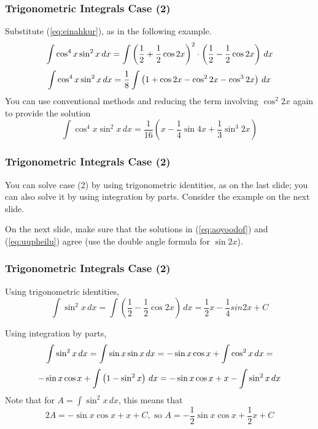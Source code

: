 \documentclass[xcolor=dvipsnames]{beamer}
\begin{document}
\begin{frame}
  \frametitle{Trigonometric Integrals Case (2)}
Substitute (\ref{eq:einahkur}), as in the following example.
\begin{equation}
  \label{eq:owamaela}
  \int\cos^{4}x\sin^{2}x\,dx=\int\left(\frac{1}{2}+\frac{1}{2}\cos{}2x\right)^{2}\cdot\left(\frac{1}{2}-\frac{1}{2}\cos{}2x\right)\,dx\notag
\end{equation}
\begin{equation}
  \label{eq:acahjahj}
  \int\cos^{4}x\sin^{2}x\,dx=\frac{1}{8}\int\left(1+\cos{}2x-\cos^{2}2x-\cos^{3}2x\right)\,dx\notag
\end{equation}
You can use conventional methods and reducing the term involving
$\cos^{2}2x$ again to provide the solution
\begin{equation}
  \label{eq:cohnalee}
  \int\cos^{4}x\sin^{2}x\,dx=\frac{1}{16}\left(x-\frac{1}{4}\sin{}4x+\frac{1}{3}\sin^{3}2x\right)
\end{equation}
\end{frame}

\begin{frame}
  \frametitle{Trigonometric Integrals Case (2)}
You can solve case (2) by using trigonometric identities, as on the
last slide; you can also solve it by using integration by parts. Consider
the example on the next slide.

\bigskip

On the next slide, make sure that the solutions in (\ref{eq:aoyoodof}) and
(\ref{eq:uupheilu}) agree (use the double angle formula for $\sin{}2x$).
\end{frame}

\begin{frame}
  \frametitle{Trigonometric Integrals Case (2)}
Using trigonometric identities,
\begin{equation}
  \label{eq:aoyoodof}
  \int\sin^{2}x\,dx=\int\left(\frac{1}{2}-\frac{1}{2}\cos{}2x\right)\,dx=\frac{1}{2}x-\frac{1}{4}sin{}2x+C
\end{equation}

Using integration by parts,
\begin{equation}
  \label{eq:hezaifoo}
  \int\sin^{2}x\,dx=\int\sin{}x\sin{}x\,dx=-\sin{}x\cos{}x+\int\cos^{2}x\,dx=\notag
\end{equation}
\begin{equation}
  \label{eq:uophaequ}
  -\sin{}x\cos{}x+\int\left(1-\sin^{2}x\right)\,dx=-\sin{}x\cos{}x+x-\int\sin^{2}x\,dx\notag
\end{equation}
Note that for $A=\int\sin^{2}x\,dx$, this means that
\begin{equation}
  \label{eq:uupheilu}
  2A=-\sin{}x\cos{}x+x+C,\mbox{ so }A=-\frac{1}{2}\sin{}x\cos{}x+\frac{1}{2}x+C
\end{equation}
\end{frame}
\end{document}
